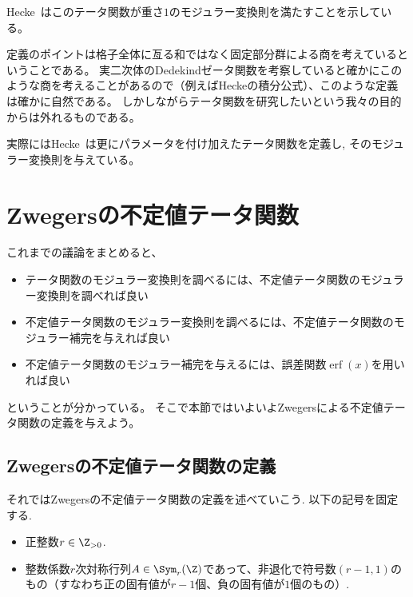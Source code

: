 \documentclass[11pt,b5paper,oneside,lualatex]{ltjsarticle} %
\DeclareMathOperator{\erf}{erf}
\numberwithin{equation}{section} %
\begin{document}
Hecke~\cite[Satz 7]{Hecke}はこのテータ関数が重さ$ 1 $のモジュラー変換則を満たすことを示している。

定義のポイントは格子全体に亙る和ではなく固定部分群による商を考えているということである。
実二次体のDedekindゼータ関数を考察していると確かにこのような商を考えることがあるので（例えばHeckeの積分公式）、このような定義は確かに自然である。
しかしながらテータ関数を研究したいという我々の目的からは外れるものである。

\begin{rem}
	実際にはHecke~\cite{Hecke}は更にパラメータを付け加えたテータ関数を定義し, そのモジュラー変換則を与えている。
\end{rem}



\section{Zwegersの不定値テータ関数} \label{sec:Zwegers_theta}


これまでの議論をまとめると、
\begin{itemize}
	\item {}テータ関数のモジュラー変換則を調べるには、不定値テータ関数のモジュラー変換則を調べれば良い
	\item 不定値テータ関数のモジュラー変換則を調べるには、不定値テータ関数のモジュラー補完を与えれば良い
	\item 不定値テータ関数のモジュラー補完を与えるには、誤差関数$ \erf(x) $を用いれば良い
\end{itemize}
ということが分かっている。
そこで本節ではいよいよZwegersによる不定値テータ関数の定義を与えよう。


\subsection{Zwegersの不定値テータ関数の定義} \label{subsec:Zwegers_theta_def}


それではZwegersの不定値テータ関数の定義を述べていこう. 
以下の記号を固定する. 

\begin{symb}
	\begin{itemize}
		\item 正整数$ r \in \Z_{>0} $.
		\item 整数係数$ r $次対称行列$ A \in \Sym_r(\Z) $であって、非退化で符号数$ (r-1, 1) $のもの（すなわち正の固有値が$ r-1 $個、負の固有値が$ 1 $個のもの）.
	\end{itemize}
\end{symb}
\end{document}
